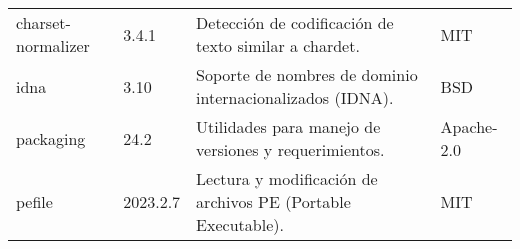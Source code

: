 \begin{longtable}[]{@{}llll@{}}
    \begin{minipage}[t]{0.18\columnwidth}\raggedright\strut charset-normalizer \strut \end{minipage} & \begin{minipage}[t]{0.10\columnwidth}\raggedright\strut 3.4.1 \strut \end{minipage} & \begin{minipage}[t]{0.49\columnwidth}\raggedright\strut Detección de codificación de texto similar a chardet. \strut \end{minipage} & \begin{minipage}[t]{0.11\columnwidth}\raggedright\strut MIT \strut \end{minipage} \tabularnewline

    \begin{minipage}[t]{0.18\columnwidth}\raggedright\strut idna \strut \end{minipage} & \begin{minipage}[t]{0.10\columnwidth}\raggedright\strut 3.10 \strut \end{minipage} & \begin{minipage}[t]{0.49\columnwidth}\raggedright\strut Soporte de nombres de dominio internacionalizados (IDNA). \strut \end{minipage} & \begin{minipage}[t]{0.11\columnwidth}\raggedright\strut BSD \strut \end{minipage} \tabularnewline

    \begin{minipage}[t]{0.18\columnwidth}\raggedright\strut packaging \strut \end{minipage} & \begin{minipage}[t]{0.10\columnwidth}\raggedright\strut 24.2 \strut \end{minipage} & \begin{minipage}[t]{0.49\columnwidth}\raggedright\strut Utilidades para manejo de versiones y requerimientos. \strut \end{minipage} & \begin{minipage}[t]{0.11\columnwidth}\raggedright\strut Apache-2.0 \strut \end{minipage} \tabularnewline

    \begin{minipage}[t]{0.18\columnwidth}\raggedright\strut pefile \strut \end{minipage} & \begin{minipage}[t]{0.10\columnwidth}\raggedright\strut 2023.2.7 \strut \end{minipage} & \begin{minipage}[t]{0.49\columnwidth}\raggedright\strut Lectura y modificación de archivos PE (Portable Executable). \strut \end{minipage} & \begin{minipage}[t]{0.11\columnwidth}\raggedright\strut MIT \strut \end{minipage} \tabularnewline


\end{longtable}
